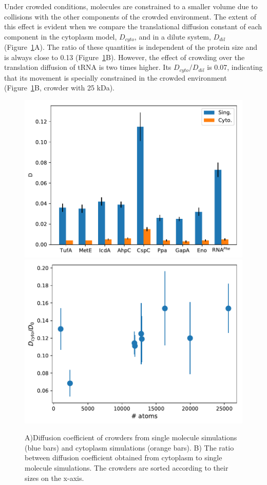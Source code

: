 \documentclass[journal=jacsat,manuscript=article]{achemso}
\begin{document}
Under crowded conditions, molecules are constrained to a smaller volume due to collisions with the other components of the crowded environment. The extent of this effect is evident when we compare the translational diffusion constant of each component in the cytoplasm model, $D_{cyto}$, and in a dilute system, $D_{dil}$ (Figure~\ref{fig:translational_diffusion}A). The ratio of these quantities is independent of the protein size and is always close to 0.13 (Figure~\ref{fig:translational_diffusion}B). However, the effect of crowding over the translation diffusion of tRNA is two times higher. Its $D_{cyto}/D_{dil}$ is 0.07, indicating that its movement is specially constrained in the crowded environment (Figure~\ref{fig:translational_diffusion}B, crowder with 25 kDa).

\begin{figure}[H]
\includegraphics[scale=0.5]{msd.pdf}
\includegraphics[scale=0.5]{diff_cyto_over_singles.pdf}
\caption{A)Diffusion coefficient of crowders from single molecule simulations (blue bars) and cytoplasm simulations (orange bars). B) The ratio between diffusion coefficient obtained from cytoplasm to single molecule simulations. The crowders are sorted according to their sizes on the x-axis.}
\label{fig:translational_diffusion}
\end{figure}
\end{document}
